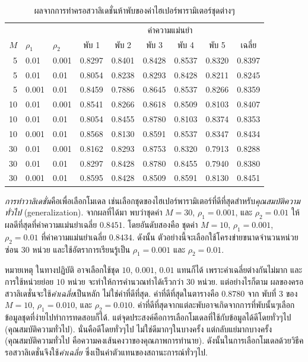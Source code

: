\begin{table}[hbtp]
{\scriptsize
\caption{ผลจากการทำครอสวาลิเดชั่นห้าพับของค่าไฮเปอร์พารามิเตอร์ชุดต่างๆ}
\label{tbl: ann app x val results}
\begin{center}
\begin{tabular}{|r|l|l|c|c|c|c|c|c|}
\hline 
    &          &          & \multicolumn{6}{c|}{ค่าความแม่นยำ} \\
\cline{4-9}        
$M$ & $\rho_1$ & $\rho_2$ & พับ 1 & พับ 2 & พับ 3 & พับ 4 & พับ 5 & เฉลี่ย \\
\hline
5 & 	0.01 & 	0.001 & 	0.8297 & 	0.8401 & 	0.8428 & 	0.8537 & 	0.8320 & 	0.8397 \\
5 & 	0.01 & 	0.01 & 	0.8054 & 	0.8238 & 	0.8293 & 	0.8428 & 	0.8211 & 	0.8245 \\
5 & 	0.001 & 	0.01 & 	0.8459 & 	0.7886 & 	0.8645 & 	0.8537 & 	0.8266 & 	0.8359 \\
10 & 	0.01 & 	0.001 & 	0.8541 & 	0.8266 & 	0.8618 & 	0.8509 & 	0.8103 & 	0.8407 \\
10 & 	0.01 & 	0.01 & 	0.8054 & 	0.8455 & 	0.8780 & 	0.8103 & 	0.8374 & 	0.8353 \\
10 & 	0.001 & 	0.01 & 	0.8568 & 	0.8130 & 	0.8591 & 	0.8537 & 	0.8347 & 	0.8434 \\
30 & 	0.01 & 	0.001 & 	0.8162 & 	0.8293 & 	0.8753 & 	0.8320 & 	0.7913 & 	0.8288 \\
30 & 	0.01 & 	0.01 & 	0.8297 & 	0.8428 & 	0.8780 & 	0.8455 & 	0.7940 & 	0.8380 \\
30 & 	0.001 & 	0.01 & 	0.8595 & 	0.8428 & 	0.8509 & 	0.8591 & 	0.8130 & 	0.8451 \\
\hline
\end{tabular} 
\end{center}
}%
\end{table}

\textit{การทำวาลิเดชั่น}คือเพื่อเลือกโมเดล เช่นเลือกชุดของไฮเปอร์พารามิเตอร์ที่ดีที่สุดสำหรับ\textit{คุณสมบัติความทั่วไป} (generalization).
จากผลที่ได้มา พบว่าชุดค่า $M=30$, $\rho_1=0.001$, และ $\rho_2=0.01$ ให้ผลดีที่สุดที่ค่าความแม่นยำเฉลี่ย $0.8451$.
โดยอันดับสองคือ ชุดค่า $M=10$, $\rho_1=0.001$, $\rho_2=0.01$ ที่ค่าความแม่นยำเฉลี่ย $0.8434$.
ดังนั้น ตัวอย่างนี้จะเลือกใช้โครงข่ายขนาดจำนวนหน่วยซ่อน $30$ หน่วย และใช้อัตราการเรียนรู้เป็น $\rho_1 = 0.001$ และ $\rho_2 = 0.01$.

หมายเหตุ ในทางปฏิบัติ อาจเลือกใช้ชุด $10$, $0.001$, $0.01$ แทนก็ได้
เพราะค่าเฉลี่ยต่างกันไม่มาก และการใช้หน่วยย่อย $10$ หน่วย จะทำให้การคำนวณทำได้เร็วกว่า $30$ หน่วย.
แต่อย่างไรก็ตาม ผลของครอสวาลิเดชั่นจะใช้\textit{ค่าเฉลี่ย}เป็นหลัก ไม่ใช่ค่าที่ดีที่สุด.
ค่าที่ดีที่สุดในตารางคือ $0.8780$ จาก พับที่ 3 ของ $M=10$, $\rho_1=0.010$, และ $\rho_2=0.010$.
ค่าที่ดีที่สุดจากแต่ละพับอาจเกิดจากการที่พับนั้นๆเลือกข้อมูลชุดที่ง่ายไปทำการทดสอบก็ได้.
แต่จุดประสงค์คือการเลือกโมเดลที่ใช้กับข้อมูลได้ดีโดยทั่วๆไป (คุณสมบัติความทั่วไป).
นั่นคือดีโดยทั่วๆไป ไม่ใช่ดีมากๆในบางครั้ง แต่กลับแย่มากบางครั้ง (คุณสมบัติความทั่วไป คือความคงเส้นคงวาของคุณภาพการทำนาย).
ดังนั้นในการเลือกโมเดลด้วยวิธีครอสวาลิเดชั่นจึงใช้\textit{ค่าเฉลี่ย} ซึ่งเป็นค่าตัวแทนของสถานะการณ์ทั่วๆไป.

